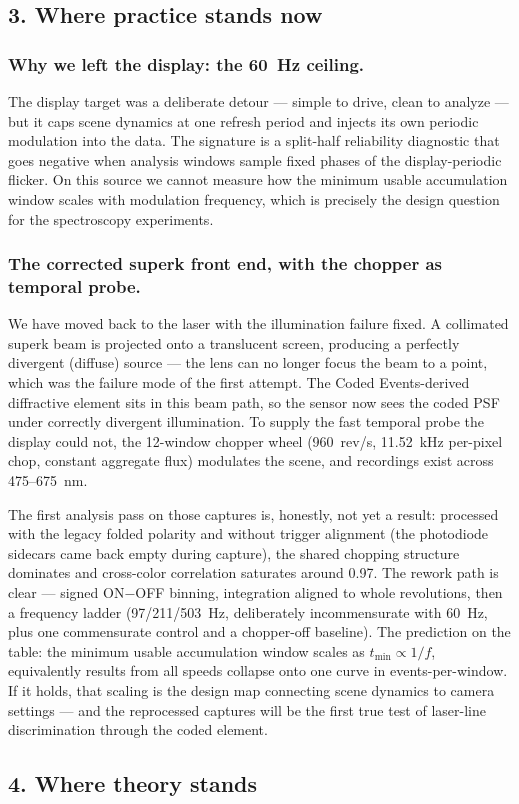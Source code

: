 \documentclass[11pt,a4paper]{article}
\newcommand{\heading}[1]{\subsection*{\color{reportblue}#1}}
\newcommand{\subheading}[1]{\subsubsection*{\color{accent}#1}}
\begin{document}
\heading{3. Where practice stands now}

\subheading{Why we left the display: the 60~Hz ceiling.} The display target was a
deliberate detour --- simple to drive, clean to analyze --- but it caps scene
dynamics at one refresh period and injects its own periodic modulation into the data.
The signature is a split-half reliability diagnostic that goes negative when analysis
windows sample fixed phases of the display-periodic flicker. On this source we
cannot measure how the minimum usable accumulation window scales with modulation
frequency, which is precisely the design question for the spectroscopy experiments.

\subheading{The corrected superk front end, with the chopper as temporal probe.} We
have moved back to the laser with the illumination failure fixed. A collimated
superk beam is projected onto a translucent screen, producing a perfectly divergent
(diffuse) source --- the lens can no longer focus the beam to a point, which was the
failure mode of the first attempt. The Coded Events-derived diffractive element sits
in this beam path, so the sensor now sees the coded PSF under correctly divergent
illumination. To supply the fast temporal probe the display could not, the 12-window
chopper wheel (960~rev/s, 11.52~kHz per-pixel chop, constant aggregate flux)
modulates the scene, and recordings exist across 475--675~nm.

The first analysis pass on those captures is, honestly, not yet a result: processed
with the legacy folded polarity and without trigger alignment (the photodiode
sidecars came back empty during capture), the shared chopping structure dominates and
cross-color correlation saturates around 0.97. The rework path is clear --- signed
ON$-$OFF binning, integration aligned to whole revolutions, then a frequency ladder
(97/211/503~Hz, deliberately incommensurate with 60~Hz, plus one commensurate
control and a chopper-off baseline). The prediction on the table: the minimum usable
accumulation window scales as $t_{\min} \propto 1/f$, equivalently results from all
speeds collapse onto one curve in events-per-window. If it holds, that scaling is
the design map connecting scene dynamics to camera settings --- and the reprocessed
captures will be the first true test of laser-line discrimination through the coded
element.

\heading{4. Where theory stands}
\end{document}
